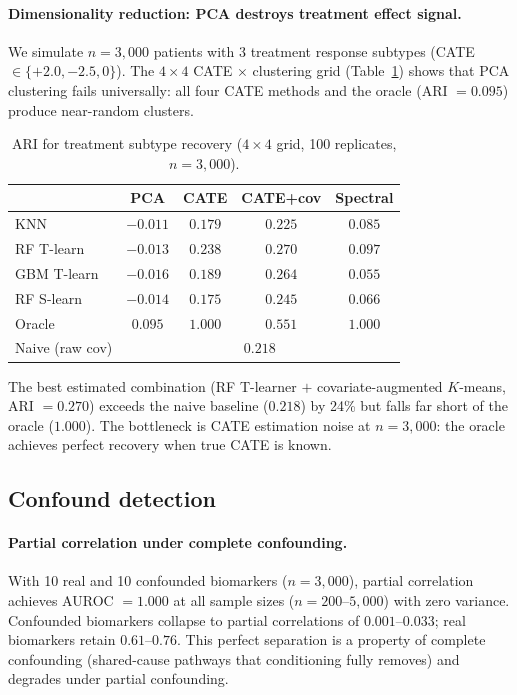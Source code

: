 \documentclass[11pt]{article}
\begin{document}
\paragraph{Dimensionality reduction: PCA destroys treatment effect signal.}
We simulate $n = 3{,}000$ patients with 3 treatment response subtypes (CATE $\in \{+2.0, -2.5, 0\}$).
The $4 \times 4$ CATE $\times$ clustering grid (Table~\ref{tab:hte}) shows that PCA clustering fails universally: all four CATE methods and the oracle (ARI $= 0.095$) produce near-random clusters.

\begin{table}[t]
\centering
\caption{ARI for treatment subtype recovery ($4 \times 4$ grid, 100 replicates, $n = 3{,}000$).}
\label{tab:hte}
\small
\begin{tabular}{@{}lcccc@{}}
\toprule
 & \textbf{PCA} & \textbf{CATE} & \textbf{CATE+cov} & \textbf{Spectral} \\
\midrule
KNN       & $-0.011$ & $0.179$ & $0.225$ & $0.085$ \\
RF T-learn  & $-0.013$ & $0.238$ & $\mathbf{0.270}$ & $0.097$ \\
GBM T-learn & $-0.016$ & $0.189$ & $0.264$ & $0.055$ \\
RF S-learn  & $-0.014$ & $0.175$ & $0.245$ & $0.066$ \\
\midrule
Oracle        & $0.095$  & $1.000$ & $0.551$ & $1.000$ \\
Naive (raw cov) & \multicolumn{4}{c}{$0.218$} \\
\bottomrule
\end{tabular}
\end{table}

The best estimated combination (RF T-learner $+$ covariate-augmented $K$-means, ARI $= 0.270$) exceeds the naive baseline ($0.218$) by 24\% but falls far short of the oracle ($1.000$).
The bottleneck is CATE estimation noise at $n = 3{,}000$: the oracle achieves perfect recovery when true CATE is known.

\subsection{Confound detection}
\label{sec:res-confound}

\paragraph{Partial correlation under complete confounding.}
With 10 real and 10 confounded biomarkers ($n = 3{,}000$), partial correlation achieves AUROC $= 1.000$ at all sample sizes ($n = 200$--$5{,}000$) with zero variance.
Confounded biomarkers collapse to partial correlations of $0.001$--$0.033$; real biomarkers retain $0.61$--$0.76$.
This perfect separation is a property of complete confounding (shared-cause pathways that conditioning fully removes) and degrades under partial confounding.
\end{document}
